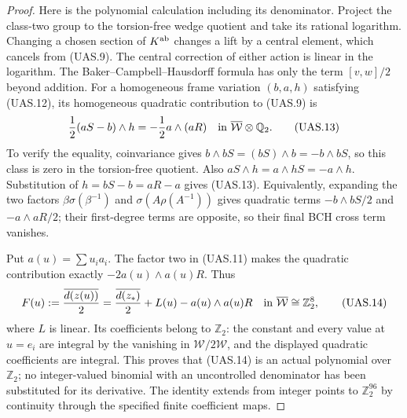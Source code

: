 \begin{proof}
Here is the polynomial calculation including its denominator.
Project the class-two group to the torsion-free wedge quotient and
take its rational logarithm.  Changing a chosen section of
$K^{\rm ab}$ changes a lift by a central element, which cancels
from (UAS.9).  The central correction of either action is linear
in the logarithm.  The Baker--Campbell--Hausdorff formula has only
the term $[v,w]/2$ beyond addition.  For a homogeneous frame
variation $(b,a,h)$ satisfying (UAS.12), its homogeneous quadratic
contribution to (UAS.9) is
\[
       \frac12(aS-b)\wedge h
                   =-\frac12 a\wedge(aR)
                   \quad\hbox{in }\overline{\mathcal W}\otimes\mathbb Q_2.
                                                                    \tag{UAS.13}
\]
To verify the equality, coinvariance gives
$b\wedge bS=(bS)\wedge b=-b\wedge bS$, so this class is zero
in the torsion-free quotient.  Also
$aS\wedge h=a\wedge hS=-a\wedge h$.
Substitution of $h=bS-b=aR-a$ gives (UAS.13).
Equivalently, expanding the two factors
$\beta\sigma(\beta^{-1})$ and
$\sigma(A\rho(A^{-1}))$ gives quadratic terms
$-b\wedge bS/2$ and $-a\wedge aR/2$; their first-degree
terms are opposite, so their final BCH cross term vanishes.

Put $a(u)=\sum u_i a_i$.  The factor two in (UAS.11) makes the
quadratic contribution exactly $-2a(u)\wedge a(u)R$.
Thus
\[
 F(u):=\frac{\overline{d(z(u))}}2
   =\frac{\overline{d(z_*)}}2+L(u)-a(u)\wedge a(u)R
      \quad\hbox{in }\overline{\mathcal W}\cong\mathbb Z_2^8,
                                                                    \tag{UAS.14}
\]
where $L$ is linear.  Its coefficients belong to $\mathbb Z_2$:
the constant and every value at $u=e_i$ are integral by the
vanishing in $\mathcal W/2\mathcal W$, and the displayed quadratic
coefficients are integral.  This proves that (UAS.14) is an actual
polynomial over $\mathbb Z_2$; no integer-valued binomial with an
uncontrolled denominator has been substituted for its derivative.
The identity extends from integer points to $\mathbb Z_2^{96}$
by continuity through the specified finite coefficient maps.


\end{proof}
